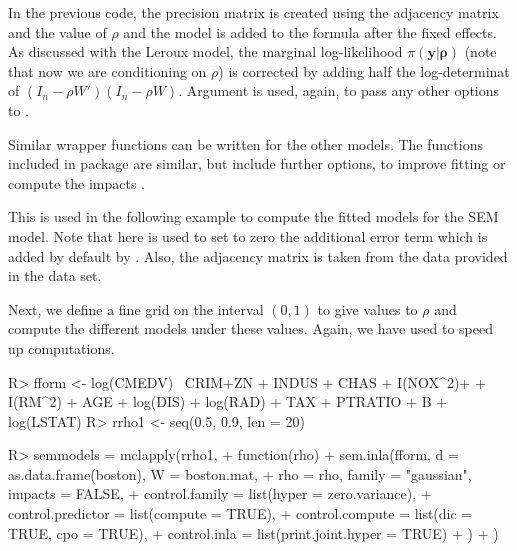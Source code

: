 \documentclass[article]{jss}
\begin{document}
In the previous code, the precision matrix  is created using the
adjacency matrix and the value of $\rho$ and the  model is added
to the formula after the fixed effects. As discussed with the Leroux model, the
marginal log-likelihood $\pi(\mathbf{y|\rho})$  (note that now we are
conditioning on $\rho$) is corrected by adding half the log-determinat of
$(I_n-\rho W')(I_n-\rho W)$.  Argument  is used, again, to pass any other
options to .

Similar wrapper functions can be written for the other models. The functions
included in package  are similar, but include further options,
to improve fitting or compute the impacts 
\citep[see,][for details]{Bivandetal:2014}.

This is used in the following example to compute the fitted models
for the SEM model. Note that here  is used to set
to zero the additional error term which is added by default by .
Also, the adjacency matrix is taken from the data provided in the 
data set.

\begin{Schunk}
\end{Schunk}

Next, we define a fine grid on the interval $(0,1)$ to give values
to $\rho$ and compute the different models under these values. Again,
we have used   to speed up computations.


\begin{Schunk}
\begin{Sinput}
R> fform <- log(CMEDV) ~CRIM+ZN + INDUS + CHAS + I(NOX^2)+
+     I(RM^2) +  AGE + log(DIS) + log(RAD) + TAX + PTRATIO + B + log(LSTAT)
R> rrho1 <- seq(0.5, 0.9, len = 20)
\end{Sinput}
\end{Schunk}
\begin{Schunk}
\begin{Sinput}
R> semmodels = mclapply(rrho1,
+          function(rho) {
+                  sem.inla(fform, d = as.data.frame(boston), W = boston.mat, 
+  			rho = rho, family = "gaussian", impacts = FALSE,
+                          control.family = list(hyper = zero.variance),
+                          control.predictor = list(compute = TRUE),
+                          control.compute = list(dic = TRUE, cpo = TRUE),
+                          control.inla = list(print.joint.hyper = TRUE)
+                  )
+          })
\end{Sinput}
\end{Schunk}
\end{document}
